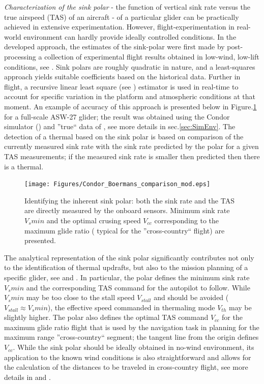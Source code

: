 \documentclass{ifacconf}
\begin{document}
\emph{Characterization of the sink polar} - the function of vertical sink
rate versus the true airspeed (TAS) of an aircraft - of a particular glider
can be practically achieved in extensive experimentation. However,
flight-experimentation in real-world environment can hardly provide ideally
controlled conditions. In the developed approach, the estimates of the
sink-polar were first made by post-processing a collection of experimental
flight results obtained in low-wind, low-lift conditions, see
\cite{AKlass_JGCD:2012}. Sink polars are roughly quadratic in nature, and a
least-squares approach yields suitable coefficients based on the historical
data. Further in flight, a recursive linear least square (see
\cite{Astrom:1995}) estimator is used in real-time to account for specific
variation in the platform and atmospheric conditions at that moment. An
example of accuracy of this approach is presented below in
Figure.\ref{fig:SinkPolar} for a full-scale ASW-27 glider; the result was
obtained using the Condor simulator (\cite{Condor:2013:Online}) and ''true``
data of \cite{Boermans:1994}, see more details in sec.\ref{sec:SimEnv}. The
detection of a thermal based on the sink polar is based on comparison of the
currently measured sink rate with the sink rate predicted by the polar for a
given TAS measurements; if the measured sink rate is smaller then predicted
then there is a thermal.
\begin{figure}[thpb]
  \centering
  \texttt{[image: Figures/Condor\_Boermans\_comparison\_mod.eps]}
  \caption{Identifying the inherent sink polar: both the sink rate and the
  TAS are directly measured by the onboard sensors. Minimum sink rate
  $V_s min$ and the optimal crusing speed $V_{cc}$  corresponding to
  the maximum glide ratio ( typical for the ''cross-country`` flight) are
  presented.}
  \label{fig:SinkPolar}
\end{figure}
The analytical representation of the sink polar significantly contributes not
only to the identification of thermal updrafts, but also to the mission
planning of a specific glider, see \cite{Piggott:1997} and \cite{FAA:2011}.
In particular, the polar defines the minimum sink rate $V_{s}min$ and the
corresponding TAS command for the autopilot to follow. While $V_{s}min$ may
be too close to the stall speed $V_{stall}$ and should be avoided ($V_{stall}
\approx V_{s}min$), the effective speed commanded in thermaling mode $V_{th}$
may be slightly higher. The polar also defines the optimal TAS command
$V_{cc}$ for the maximum glide ratio flight that is used by the navigation
task in planning for the maximum range ''cross-country`` segment; the tangent
line from the origin defines $V_{cc}$. While the sink polar should be ideally
obtained in no-wind environment, its application to the known wind conditions
is also straightforward and allows for the calculation of the distances to be
traveled in cross-country flight, see more details in \cite{Piggott:1997} and
\cite{FAA:2011}.
\end{document}
